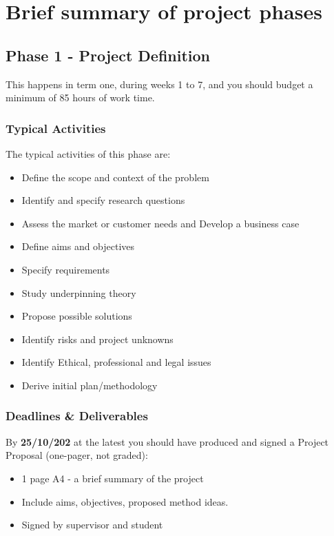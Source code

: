 \section{Brief summary of project phases}

\subsection{Phase 1 - Project Definition}

This happens in term one, during weeks 1 to 7, and you should budget a minimum of 85 hours of work time.

\subsubsection{Typical Activities}

The typical activities of this phase are:

\begin{itemize}
    \item Define the scope and context of the problem
    \item Identify and specify research questions
    \item Assess the market or customer needs and Develop a business case
    \item Define aims and objectives
    \item Specify requirements
    \item Study underpinning theory
    \item Propose possible solutions
    \item Identify risks and project unknowns
    \item Identify Ethical, professional and legal issues
    \item Derive initial plan/methodology
\end{itemize}

\subsubsection{Deadlines \& Deliverables}

By \textbf{25/10/202} at the latest you should have produced and signed a Project Proposal (one-pager, not graded):

\begin{itemize}
    \item 1 page A4 - a brief summary of the project
    \item Include aims, objectives, proposed method ideas.
    \item Signed by supervisor and student
\end{itemize}

